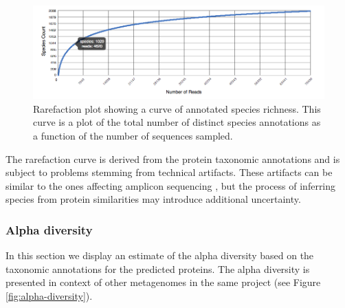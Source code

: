 \documentclass[12pt,fullpage]{report}
\begin{document}

\begin{figure}
\begin{center}
\includegraphics[width=6in]{Images/rarefaction.png}
\end{center}
\caption{
Rarefaction plot showing a curve of annotated species richness. This curve is a plot of the total number of distinct species annotations as a function of the number of sequences sampled.
}
\label{fig:rarefaction}
\end{figure}

The rarefaction curve is derived from the protein taxonomic annotations and is subject to problems stemming from technical artifacts. These artifacts can be similar to the ones affecting amplicon sequencing \cite{RARE}, but the process of inferring species from protein similarities may introduce additional uncertainty.

\subsubsection{Alpha diversity}
In this section we display an estimate of the alpha diversity based on the taxonomic annotations for the predicted proteins. The alpha diversity is presented in context of other metagenomes in the same project (see Figure \ref{fig:alpha-diversity}).
\end{document}
